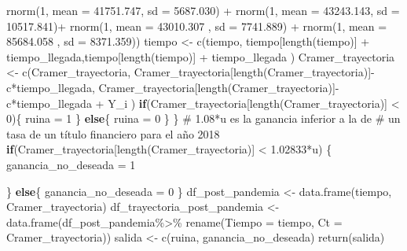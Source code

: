 \documentclass[
  us-letterpaper,
]{scrreprt}
\newenvironment{Shaded}{\begin{snugshade}}{\end{snugshade}}
\newcommand{\AttributeTok}[1]{\textcolor[rgb]{0.40,0.45,0.13}{#1}}
\newcommand{\CommentTok}[1]{\textcolor[rgb]{0.37,0.37,0.37}{#1}}
\newcommand{\ControlFlowTok}[1]{\textcolor[rgb]{0.00,0.23,0.31}{\textbf{#1}}}
\newcommand{\DecValTok}[1]{\textcolor[rgb]{0.68,0.00,0.00}{#1}}
\newcommand{\FloatTok}[1]{\textcolor[rgb]{0.68,0.00,0.00}{#1}}
\newcommand{\FunctionTok}[1]{\textcolor[rgb]{0.28,0.35,0.67}{#1}}
\newcommand{\NormalTok}[1]{\textcolor[rgb]{0.00,0.23,0.31}{#1}}
\newcommand{\OtherTok}[1]{\textcolor[rgb]{0.00,0.23,0.31}{#1}}
\newcommand{\SpecialCharTok}[1]{\textcolor[rgb]{0.37,0.37,0.37}{#1}}
\theoremstyle{definition}
\theoremstyle{plain}
\theoremstyle{plain}
\theoremstyle{remark}
\begin{document}
\begin{Shaded}
\begin{Highlighting}[]
               \FunctionTok{rnorm}\NormalTok{(}\DecValTok{1}\NormalTok{, }\AttributeTok{mean =}   \FloatTok{41751.747}\NormalTok{, }\AttributeTok{sd =} \FloatTok{5687.030}\NormalTok{) }\SpecialCharTok{+} 
               \FunctionTok{rnorm}\NormalTok{(}\DecValTok{1}\NormalTok{, }\AttributeTok{mean =}   \FloatTok{43243.143}\NormalTok{, }\AttributeTok{sd =} \FloatTok{10517.841}\NormalTok{)}\SpecialCharTok{+} 
               \FunctionTok{rnorm}\NormalTok{(}\DecValTok{1}\NormalTok{, }\AttributeTok{mean =} \FloatTok{43010.307}\NormalTok{  , }\AttributeTok{sd =} \FloatTok{7741.889}\NormalTok{) }\SpecialCharTok{+} 
               \FunctionTok{rnorm}\NormalTok{(}\DecValTok{1}\NormalTok{, }\AttributeTok{mean =}  \FloatTok{85684.058}\NormalTok{ , }\AttributeTok{sd =} \FloatTok{8371.359}\NormalTok{)) }
\NormalTok{    tiempo }\OtherTok{\textless{}{-}} \FunctionTok{c}\NormalTok{(tiempo, tiempo[}\FunctionTok{length}\NormalTok{(tiempo)] }\SpecialCharTok{+} 
\NormalTok{                  tiempo\_llegada,tiempo[}\FunctionTok{length}\NormalTok{(tiempo)] }\SpecialCharTok{+} 
\NormalTok{                  tiempo\_llegada ) }
\NormalTok{    Cramer\_trayectoria }\OtherTok{\textless{}{-}} \FunctionTok{c}\NormalTok{(Cramer\_trayectoria,}
\NormalTok{                      Cramer\_trayectoria[}\FunctionTok{length}\NormalTok{(Cramer\_trayectoria)]}\SpecialCharTok{{-}}
\NormalTok{                      c}\SpecialCharTok{*}\NormalTok{tiempo\_llegada, }
\NormalTok{                      Cramer\_trayectoria[}\FunctionTok{length}\NormalTok{(Cramer\_trayectoria)]}\SpecialCharTok{{-}} 
\NormalTok{                      c}\SpecialCharTok{*}\NormalTok{tiempo\_llegada }\SpecialCharTok{+}\NormalTok{  Y\_i )}
    \ControlFlowTok{if}\NormalTok{(Cramer\_trayectoria[}\FunctionTok{length}\NormalTok{(Cramer\_trayectoria)] }\SpecialCharTok{\textless{}} \DecValTok{0}\NormalTok{)\{}
\NormalTok{      ruina }\OtherTok{=} \DecValTok{1}
\NormalTok{    \}}
    \ControlFlowTok{else}\NormalTok{\{}
\NormalTok{      ruina }\OtherTok{=} \DecValTok{0}
\NormalTok{    \}}
\NormalTok{  \}}
\CommentTok{\# 1.08*u es la ganancia inferior a la de }
\CommentTok{\# un tasa de un título financiero para el año 2018}
  \ControlFlowTok{if}\NormalTok{(Cramer\_trayectoria[}\FunctionTok{length}\NormalTok{(Cramer\_trayectoria)] }\SpecialCharTok{\textless{}} \FloatTok{1.02833}\SpecialCharTok{*}\NormalTok{u) \{}
\NormalTok{    ganancia\_no\_deseada }\OtherTok{=} \DecValTok{1}
    
\NormalTok{  \} }
  \ControlFlowTok{else}\NormalTok{\{}
\NormalTok{    ganancia\_no\_deseada }\OtherTok{=} \DecValTok{0}
\NormalTok{  \}}
\NormalTok{  df\_post\_pandemia }\OtherTok{\textless{}{-}} \FunctionTok{data.frame}\NormalTok{(tiempo, Cramer\_trayectoria)}
\NormalTok{  df\_trayectoria\_post\_pandemia }\OtherTok{\textless{}{-}} \FunctionTok{data.frame}\NormalTok{(df\_post\_pandemia}\SpecialCharTok{\%\textgreater{}\%} 
                                  \FunctionTok{rename}\NormalTok{(}\AttributeTok{Tiempo =}\NormalTok{ tiempo, }
                                         \AttributeTok{Ct =}\NormalTok{ Cramer\_trayectoria))}
\NormalTok{  salida }\OtherTok{\textless{}{-}} \FunctionTok{c}\NormalTok{(ruina, ganancia\_no\_deseada)}
  \FunctionTok{return}\NormalTok{(salida)}
  

\end{Highlighting}
\end{Shaded}
\end{document}
